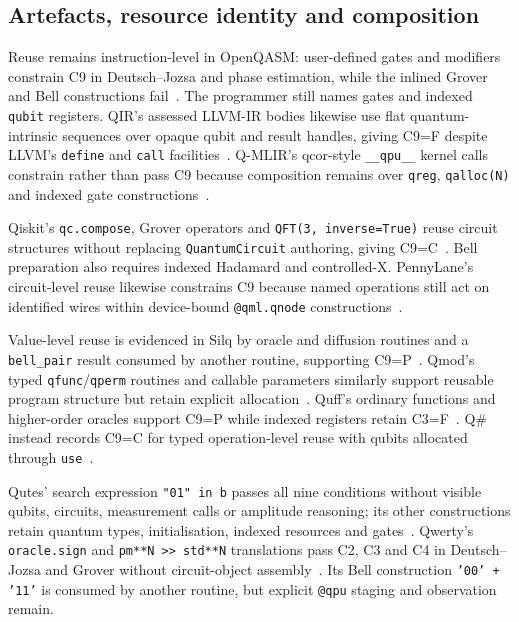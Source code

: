 \subsection{Artefacts, resource identity and composition}\label{subsec:system_assessments:artefacts_composition}
Reuse remains instruction-level in OpenQASM: user-defined gates and modifiers constrain C9 in Deutsch--Jozsa and phase estimation, while the inlined Grover and Bell constructions fail~\cite{cross2022openqasm3,kavadias2026qplSurveySupplementary}.
The programmer still names gates and indexed \texttt{qubit} registers.
QIR's assessed LLVM-IR bodies likewise use flat quantum-intrinsic sequences over opaque qubit and result handles, giving C9=F despite LLVM's \texttt{define} and \texttt{call} facilities~\cite{qir_alliance_qir_spec_repo,kavadias2026qplSurveySupplementary}.
Q-MLIR's qcor-style \texttt{\_\_qpu\_\_} kernel calls constrain rather than pass C9 because composition remains over \texttt{qreg}, \texttt{qalloc(N)} and indexed gate constructions~\cite{McCaskey2021MLIRDialectQASM,kavadias2026qplSurveySupplementary}.

Qiskit's \texttt{qc.compose}, Grover operators and \texttt{QFT(3, inverse=True)} reuse circuit structures without replacing \texttt{QuantumCircuit} authoring, giving C9=C~\cite{aleksandrowicz2019qiskit,kavadias2026qplSurveySupplementary}.
Bell preparation also requires indexed Hadamard and controlled-X\@.
PennyLane's circuit-level reuse likewise constrains C9 because named operations still act on identified wires within device-bound \texttt{@qml.qnode} constructions~\cite{bergholm2018pennylane,kavadias2026qplSurveySupplementary}.

Value-level reuse is evidenced in Silq by oracle and diffusion routines and a \texttt{bell\_pair} result consumed by another routine, supporting C9=P~\cite{bichsel2020silq,kavadias2026qplSurveySupplementary}.
Qmod's typed \texttt{qfunc}/\texttt{qperm} routines and callable parameters similarly support reusable program structure but retain explicit allocation~\cite{vax2025qmodexpressivehighlevelquantum,kavadias2026qplSurveySupplementary}.
Quff's ordinary functions and higher-order oracles support C9=P while indexed registers retain C3=F~\cite{wright2024quff,kavadias2026qplSurveySupplementary}.
Q\# instead records C9=C for typed operation-level reuse with qubits allocated through \texttt{use}~\cite{MicrosoftQSharpOverview,kavadias2026qplSurveySupplementary}.

Qutes' search expression \texttt{"01" in b} passes all nine conditions without visible qubits, circuits, measurement calls or amplitude reasoning; its other constructions retain quantum types, initialisation, indexed resources and gates~\cite{faro2025qutes,reversiblelifetime2026,kavadias2026qplSurveySupplementary}.
Qwerty's \texttt{oracle.sign} and \texttt{pm**N >> std**N} translations pass C2, C3 and C4 in Deutsch--Jozsa and Grover without circuit-object assembly~\cite{adams2024qwerty,kavadias2026qplSurveySupplementary}.
Its Bell construction \texttt{'00' + '11'} is consumed by another routine, but explicit \texttt{@qpu} staging and observation remain.


